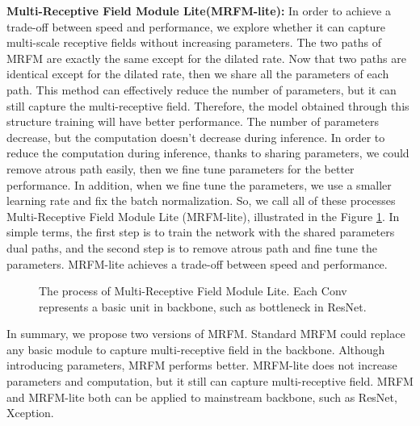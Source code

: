 \documentclass[final]{cvpr}
\begin{document}
\textbf{Multi-Receptive Field Module Lite(MRFM-lite):} In order to achieve a trade-off between speed and performance, we explore whether it can capture multi-scale receptive fields without increasing parameters. The two paths of MRFM are exactly the same except for the dilated rate. Now that two paths are identical except for the dilated rate, then we share all the parameters of each path. This method can effectively reduce the number of parameters, but it can still capture the multi-receptive field. Therefore, the model obtained through this structure training will have better performance. The number of parameters decrease, but the computation doesn't decrease during inference. In order to reduce the computation during inference, thanks to sharing parameters, we could remove atrous path easily, then we fine tune parameters for the better performance. In addition, when we fine tune the parameters, we use a smaller learning rate and fix the batch normalization. So, we call all of these processes Multi-Receptive Field Module Lite (MRFM-lite), illustrated in the Figure \ref{MRFMforefficentmodule}. In simple terms, the first step is to train the network with the shared parameters dual paths, and the second step is to remove atrous path and fine tune the parameters. MRFM-lite achieves a trade-off between speed and performance.


\begin{figure}[ht]
\caption{The process of Multi-Receptive Field Module Lite. Each Conv represents a basic unit in backbone, such as bottleneck in ResNet.}
\label{MRFMforefficentmodule}
\end{figure}


In summary, we propose two versions of MRFM. Standard MRFM could replace any basic module to capture multi-receptive field in the backbone. Although introducing parameters, MRFM performs better. MRFM-lite does not increase parameters and computation, but it still can capture multi-receptive field. MRFM and MRFM-lite both can be applied to mainstream backbone, such as ResNet, Xception.
\end{document}
